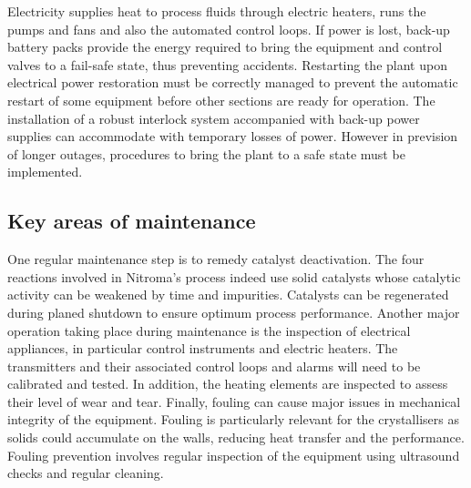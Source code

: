Electricity supplies heat to process fluids through electric heaters, runs the pumps and fans and also the automated control loops. If power is lost, back-up battery packs provide the energy required to bring the equipment and control valves to a fail-safe state, thus preventing accidents. Restarting the plant upon electrical power restoration must be correctly managed to prevent the automatic restart of some equipment before other sections are ready for operation. The installation of a robust interlock system accompanied with back-up power supplies can accommodate with temporary losses of power. However in prevision of longer outages, procedures to bring the plant to a safe state must be implemented.


\subsection{Key areas of maintenance} %
One regular maintenance step is to remedy catalyst deactivation. The four reactions involved in Nitroma's process indeed use solid catalysts whose catalytic activity can be weakened by time and impurities. Catalysts can be regenerated during planed shutdown to ensure optimum process performance. Another major operation taking place during maintenance is the inspection of electrical appliances, in particular control instruments and electric heaters. The transmitters and their associated control loops and alarms will need to be calibrated and tested. In addition, the heating elements are inspected to assess their level of wear and tear. Finally, fouling can cause major issues in mechanical integrity of the equipment. Fouling is particularly relevant for the crystallisers as solids could accumulate on the walls, reducing heat transfer and the performance. Fouling prevention involves regular inspection of the equipment using ultrasound checks and regular cleaning.
